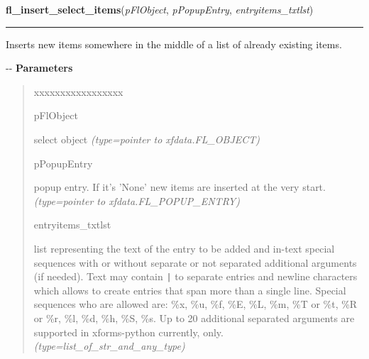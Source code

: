     \label{xformslib:flselect:fl_insert_select_items}

    \vspace{0.5ex}

\hspace{.8\funcindent}\begin{boxedminipage}{\funcwidth}

    \raggedright \textbf{fl\_insert\_select\_items}(\textit{pFlObject}, \textit{pPopupEntry}, \textit{entryitems\_txtlst})

    \vspace{-1.5ex}

    \rule{\textwidth}{0.5\fboxrule}
\setlength{\parskip}{2ex}

Inserts new items somewhere in the middle of a list of already existing
items.

-{}-
\setlength{\parskip}{1ex}
      \textbf{Parameters}
      \vspace{-1ex}

      \begin{quote}
        \begin{Ventry}{xxxxxxxxxxxxxxxxx}

          \item[pFlObject]


select object
            {\it (type=pointer to xfdata.FL\_OBJECT)}

          \item[pPopupEntry]


popup entry. If it's 'None' new items are inserted at the very start.
            {\it (type=pointer to xfdata.FL\_POPUP\_ENTRY)}

          \item[entryitems\_txtlst]


list representing the text of the entry to be added and in-text
special sequences with or without separate or not separated additional
arguments (if needed). Text may contain \texttt{|} to separate entries and
newline characters which allows to create entries that span more than
a single line. Special sequences who are allowed are: \%x, \%u, \%f, \%E,
\%L, \%m, \%T or \%t, \%R or \%r, \%l, \%d, \%h, \%S, \%s. Up to 20 additional
separated arguments are supported in xforms-python currently, only.
            {\it (type=list\_of\_str\_and\_any\_type)}

        \end{Ventry}


\end{quote}
\end{boxedminipage}
